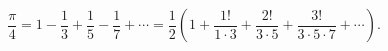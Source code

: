 \[\frac{\pi}{4}=1-\frac{1}{3}+\frac{1}{5}-\frac{1}{7}+\cdots=\frac{1}{2}\left(1+%
\frac{1!}{1\cdot 3}+\frac{2!}{3\cdot 5}+\frac{3!}{3\cdot 5\cdot 7}+\cdots%
\right).\]
